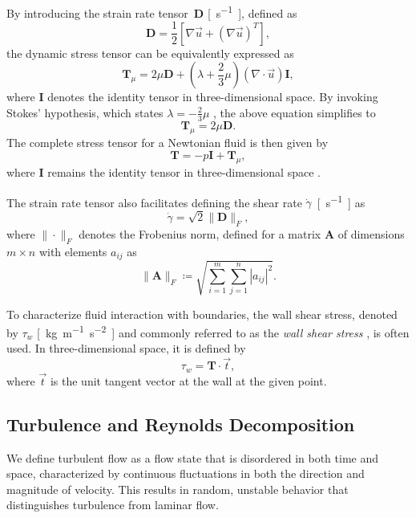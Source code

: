 By introducing the strain rate tensor~$\mathbf{D}$ \si{[s^{-1}]}, defined as
\begin{equation}\label{eq:D}
	\mathbf{D} = \frac{1}{2} \left[ \nabla \vec{u} + (\nabla \vec{u})^T \right],
\end{equation}
the dynamic stress tensor can be equivalently expressed as
\begin{equation}\label{eq:1}
	\mathbf{T}_{\mu} = 2 \mu \mathbf{D} + \left( \lambda + \frac{2}{3} \mu \right) (\nabla \cdot \vec{u}) \mathbf{I},
\end{equation}
where $ \mathbf{I} $ denotes the identity tensor in three-dimensional space. By invoking Stokes' hypothesis, which states $ \lambda = -\frac{2}{3} \mu $ \cite{Anderson}, the above equation simplifies to
\begin{equation}
	\mathbf{T}_{\mu} = 2 \mu \mathbf{D}.
\end{equation}
The complete stress tensor for a Newtonian fluid is then given by
\begin{equation}\label{eq:T}
	\mathbf{T} = -p\mathbf{I} + \mathbf{T}_{\mu},
\end{equation}
where $ \mathbf{I} $ remains the identity tensor in three-dimensional space \cite{Cengel}.

The strain rate tensor also facilitates defining the shear rate $ \dot{\gamma} $~\si{[s^{-1}]} \cite{Cengel} as
\begin{equation}\label{eq:dot gamma}
	\dot{\gamma} = \sqrt{2} \| \mathbf{D} \| _{F},
\end{equation}
where $ \| \cdot \| _{F} $ denotes the Frobenius norm, defined for a matrix $ \mathbf{A} $ of dimensions $ m \times n $ with elements $ a_{ij} $ as
\begin{equation}
	\| \mathbf{A} \| _{F}  \coloneqq \sqrt{\sum_{i = 1}^{m} \sum_{j = 1}^{n} |a_{ij}|^2}.
\end{equation}

To characterize fluid interaction with boundaries, the wall shear stress, denoted by $ \tau _w $ \si{[kg.m^{-1}.s^{-2}]} and commonly referred to as the \textit{wall shear stress} \cite{WallStress}, is often used. In three-dimensional space, it is defined by
\begin{equation}\label{eq:wall shear stress}
	\tau_w = \mathbf{T} \cdot \vec{t},
\end{equation}
where $ \vec{t} $ is the unit tangent vector at the wall at the given point.

\subsection{Turbulence and Reynolds Decomposition}\label{turb}
We define turbulent flow as a flow state that is disordered in both time and space, characterized by continuous fluctuations in both the direction and magnitude of velocity. This results in random, unstable behavior that distinguishes turbulence from laminar flow.

